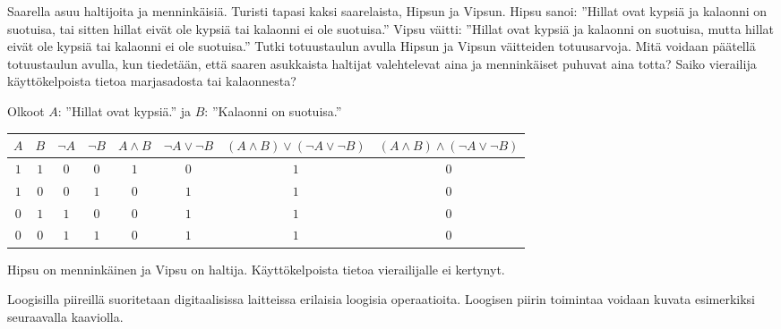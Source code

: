 \begin{tehtavasivu}
\begin{tehtava}
    Saarella asuu haltijoita ja menninkäisiä. Turisti tapasi kaksi saarelaista, Hipsun ja Vipsun. Hipsu sanoi: ''Hillat ovat kypsiä ja kalaonni on suotuisa, tai sitten hillat eivät ole kypsiä tai kalaonni ei ole suotuisa.'' Vipsu väitti: ''Hillat ovat kypsiä ja kalaonni on suotuisa, mutta hillat eivät ole kypsiä tai kalaonni ei ole suotuisa.'' Tutki totuustaulun avulla Hipsun ja Vipsun väitteiden totuusarvoja. Mitä voidaan päätellä totuustaulun avulla, kun tiedetään, että saaren asukkaista haltijat valehtelevat aina ja menninkäiset puhuvat aina totta? Saiko vierailija käyttökelpoista tietoa marjasadosta tai kalaonnesta?

    \begin{vastaus}
    Olkoot $A$: ''Hillat ovat kypsiä.'' ja $B$: ''Kalaonni on suotuisa.''
    \begin{center}
		    \begin{tabular}{|c|c|c|c|c|c|c|c|}\hline
		    $A$ & $B$ & $\lnot A$ & $\lnot B$ & $A\land B$ & 
		         $\lnot A\lor \lnot B$ & $(A \land B)\lor(\lnot A\lor \lnot B)$ & $(A\land B)\land(\lnot A\lor \lnot B)$ \\ \hline
		    $1$ & $1$ & $0$ & $0$ & $1$ & $0$ & $1$ & $0$  \\ %
		    $1$ & $0$ & $0$ & $1$ & $0$ & $1$ & $1$ & $0$  \\
		    $0$ & $1$ & $1$ & $0$ & $0$ & $1$ & $1$ & $0$  \\
		    $0$ & $0$ & $1$ & $1$ & $0$ & $1$ & $1$ & $0$  \\ \hline
\end{tabular}
\end{center}
	Hipsu on menninkäinen ja Vipsu on haltija. Käyttökelpoista tietoa vierailijalle ei kertynyt. %
    \end{vastaus}
    
\end{tehtava}

\begin{tehtava}
        Loogisilla piireillä suoritetaan digitaalisissa laitteissa erilaisia loogisia operaatioita. Loogisen piirin toimintaa voidaan kuvata esimerkiksi seuraavalla kaaviolla.

        \medskip

        \begin{center}
\end{center}
\end{tehtava}
\end{tehtavasivu}
